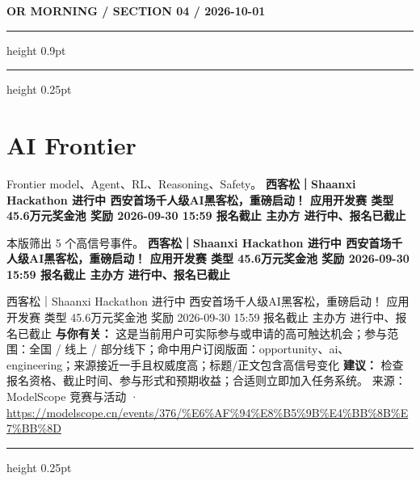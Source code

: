 \documentclass[10.5pt]{ctexart}
\begin{document}
\newpage
{\small\bfseries OR MORNING / SECTION 04 / 2026-10-01}
\vspace{2mm}
\hrule height 0.9pt
\vspace{1.5mm}
\hrule height 0.25pt
\vspace{4mm}
\section*{AI Frontier}
{\color{ormuted} Frontier model、Agent、RL、Reasoning、Safety。}
\vspace{2mm}
{\LARGE\bfseries 西客松｜Shaanxi Hackathon 进行中 西安首场千人级AI黑客松，重磅启动！ 应用开发赛 类型 45.6万元奖金池 奖励 2026-09-30 15:59 报名截止 主办方 进行中、报名已截止}\par
\vspace{1mm}
{\color{ormuted} 本版筛出 5 个高信号事件。}
\vspace{3mm}
{\Large\bfseries 西客松｜Shaanxi Hackathon 进行中 西安首场千人级AI黑客松，重磅启动！ 应用开发赛 类型 45.6万元奖金池 奖励 2026-09-30 15:59 报名截止 主办方 进行中、报名已截止}\par
西客松｜Shaanxi Hackathon 进行中 西安首场千人级AI黑客松，重磅启动！ 应用开发赛 类型 45.6万元奖金池 奖励 2026-09-30 15:59 报名截止 主办方 进行中、报名已截止
\textbf{与你有关：} 这是当前用户可实际参与或申请的高可触达机会；参与范围：全国 / 线上 / 部分线下；命中用户订阅版面：opportunity、ai、engineering；来源接近一手且权威度高；标题/正文包含高信号变化
\textbf{建议：} 检查报名资格、截止时间、参与形式和预期收益；合适则立即加入任务系统。
{\footnotesize\color{ormuted} 来源：ModelScope 竞赛与活动 · \url{https://modelscope.cn/events/376/%E6%AF%94%E8%B5%9B%E4%BB%8B%E7%BB%8D}}
\vspace{4mm}
\hrule height 0.25pt
\vspace{3mm}
\end{document}
